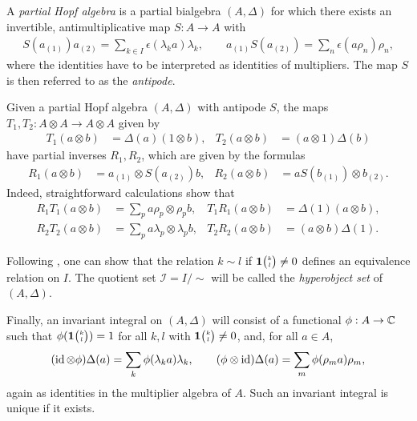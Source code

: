 
A \emph{partial Hopf algebra} \cite[Definition 1.7]{DCT1} is a partial bialgebra $(A,\Delta)$ for which there exists an invertible, antimultiplicative map $S: A\rightarrow A$ with
\begin{align} \label{eq:antipode}
  S(a_{(1)})a_{(2)} = \sum_{k\in I} \epsilon(\lambda_ka)\lambda_k,\qquad a_{(1)}S(a_{(2)}) = \sum_n\epsilon(a\rho_n)\rho_n,
\end{align}
where the identities have to be interpreted as identities of multipliers. The map $S$ is then referred to as the \emph{antipode}. 

Given a partial Hopf algebra $(A,\Delta)$ with  antipode  $S$,  the maps
  $T_{1},T_{2} \colon A \otimes A \to A \otimes A$ given by
  \begin{align*}
  T_{1} (a\otimes b)&= \Delta(a)(1 \otimes b), &
  T_{2} (a\otimes b)&= (a \otimes 1)\Delta(b)
\end{align*}
have partial inverses $R_{1},R_{2}$, which are given by the formulas
\begin{align*}
    R_{1}(a \otimes b) &= a_{(1)}\otimes S(a_{(2)})b, &
    R_{2}(a\otimes b) &= aS(b_{(1)})\otimes b_{(2)}.
  \end{align*}
Indeed, straightforward calculations show that
\begin{align} \label{eq:canonical-maps}
R_{1}T_{1} (a\otimes b) &=
 \sum_{p} a\rho_{p} \otimes \rho_{p}b, &  T_{1}R_{1}(a \otimes b) &=\Delta(1)(a\otimes b), \\ \label{eq:e2g2}
R_{2}T_{2}(a \otimes b) &= \sum_{p} a\lambda_{p} \otimes
    \lambda_{p}b, &
T_{2}R_{2}(a\otimes b) &= (a\otimes b)\Delta(1).
\end{align}

Following \cite[Definition 1.8]{DCT1}, one can show that the relation $k\sim l$ if $\mathbf{1}{\tiny {\begin{pmatrix} k\\l\end{pmatrix}}}\neq0$ defines an equivalence relation on $I$. The quotient set $\mathscr{I} = I/\sim$ will be called the \emph{hyperobject set} of $(A,\Delta)$.

Finally, an invariant integral on $(A,\Delta)$ \cite[Definition 1.12]{DCT1} will consist of a functional $\phi: A\rightarrow \mathbb{C}$ such that $\phi(\mathbf{1}{\tiny {\begin{pmatrix} k\\l\end{pmatrix}}})=1$ for all $k,l$ with $\mathbf{1}{\tiny {\begin{pmatrix} k\\l\end{pmatrix}}}\neq 0$, and, for all $a\in A$,
\begin{align} \label{eq:integral}
  (\operatorname{id}\otimes \phi)\Delta(a) = \sum_{k} \phi(\lambda_k a)\lambda_k,\qquad (\phi\otimes \operatorname{id})\Delta(a) = \sum_m \phi(\rho_m a)\rho_m,
\end{align}
again as identities in the multiplier algebra of $A$. Such an invariant integral is unique if it exists.

